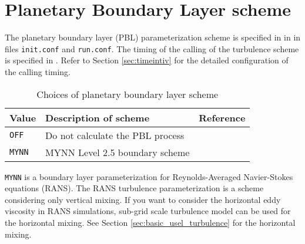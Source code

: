 
\section{Planetary Boundary Layer scheme} \label{sec:basic_usel_pbl}

The planetary boundary layer (PBL) parameterization scheme is specified in  in  in files \verb|init.conf| and \verb|run.conf|. The timing of the calling of the turbulence scheme is specified in . Refer to Section \ref{sec:timeintiv} for the detailed configuration of the calling timing.

\begin{table}[h]
\begin{center}
  \caption{Choices of planetary boundary layer scheme}
  \label{tab:nml_atm_bl}
  \begin{tabularx}{150mm}{lXX} \hline
    \rowcolor[gray]{0.9}  Value & Description of scheme & Reference\\ \hline
      \verb|OFF|          & Do not calculate the PBL process &  \\
      \verb|MYNN|         & MYNN Level 2.5 boundary scheme & \citet{my_1982,nakanishi_2004} \\
    \hline
  \end{tabularx}
\end{center}
\end{table}

\verb|MYNN| is a boundary layer parameterization for Reynolds-Averaged Navier-Stokes equations (RANS).
The RANS turbulence parameterization is a scheme considering only vertical mixing.
If you want to consider the horizontal eddy viscosity in RANS simulations,
sub-grid scale turbulence model can be used for the horizontal mixing.
See Section \ref{sec:basic_usel_turbulence} for the horizontal mixing.
